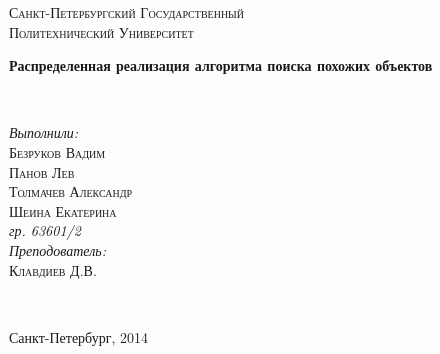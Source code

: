 \documentclass[12pt,a4paper]{report}
\begin{document}
\begin{titlepage}

\center %
 

\textsc{\large Санкт-Петербургский Государственный}\\
\textsc{\large Политехнический Университет}\\
[9cm] 


\begin{spacing}{2}
{ \huge \bfseries Распределенная реализация алгоритма поиска похожих объектов }\\[1.5cm]
\end{spacing}


\begin{minipage}{0.4\textwidth}
\begin{flushleft} \large

\end{flushleft}
\end{minipage}
~
\begin{minipage}{0.4\textwidth}
\begin{flushright} \large
\emph{Выполнили:}\\
\textsc{Безруков Вадим}\\ 
\textsc{Панов Лев}\\ 
\textsc{Толмачев Александр}\\ 
\textsc{Шеина Екатерина}\\ 
\emph{гр. 63601/2}\\
[0.5cm] 
\emph{Преподователь:}\\
\textsc{Клавдиев Д.В.}\\ 
\end{flushright}
\end{minipage}\\


\vfill %

{\large Санкт-Петербург, 2014}

\end{titlepage}
\end{document}
